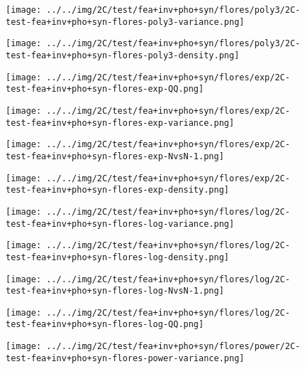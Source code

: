 \begin{figure}[H]
\centering	\texttt{[image: ../../img/2C/test/fea+inv+pho+syn/flores/poly3/2C-test-fea+inv+pho+syn-flores-poly3-variance.png]}
\end{figure}
\begin{figure}[H]
\centering	\texttt{[image: ../../img/2C/test/fea+inv+pho+syn/flores/poly3/2C-test-fea+inv+pho+syn-flores-poly3-density.png]}
\end{figure}
\begin{figure}[H]
\centering	\texttt{[image: ../../img/2C/test/fea+inv+pho+syn/flores/exp/2C-test-fea+inv+pho+syn-flores-exp-QQ.png]}
\end{figure}
\begin{figure}[H]
\centering	\texttt{[image: ../../img/2C/test/fea+inv+pho+syn/flores/exp/2C-test-fea+inv+pho+syn-flores-exp-variance.png]}
\end{figure}
\begin{figure}[H]
\centering	\texttt{[image: ../../img/2C/test/fea+inv+pho+syn/flores/exp/2C-test-fea+inv+pho+syn-flores-exp-NvsN-1.png]}
\end{figure}
\begin{figure}[H]
\centering	\texttt{[image: ../../img/2C/test/fea+inv+pho+syn/flores/exp/2C-test-fea+inv+pho+syn-flores-exp-density.png]}
\end{figure}
\begin{figure}[H]
\centering	\texttt{[image: ../../img/2C/test/fea+inv+pho+syn/flores/log/2C-test-fea+inv+pho+syn-flores-log-variance.png]}
\end{figure}
\begin{figure}[H]
\centering	\texttt{[image: ../../img/2C/test/fea+inv+pho+syn/flores/log/2C-test-fea+inv+pho+syn-flores-log-density.png]}
\end{figure}
\begin{figure}[H]
\centering	\texttt{[image: ../../img/2C/test/fea+inv+pho+syn/flores/log/2C-test-fea+inv+pho+syn-flores-log-NvsN-1.png]}
\end{figure}
\begin{figure}[H]
\centering	\texttt{[image: ../../img/2C/test/fea+inv+pho+syn/flores/log/2C-test-fea+inv+pho+syn-flores-log-QQ.png]}
\end{figure}
\begin{figure}[H]
\centering	\texttt{[image: ../../img/2C/test/fea+inv+pho+syn/flores/power/2C-test-fea+inv+pho+syn-flores-power-variance.png]}
\end{figure}
